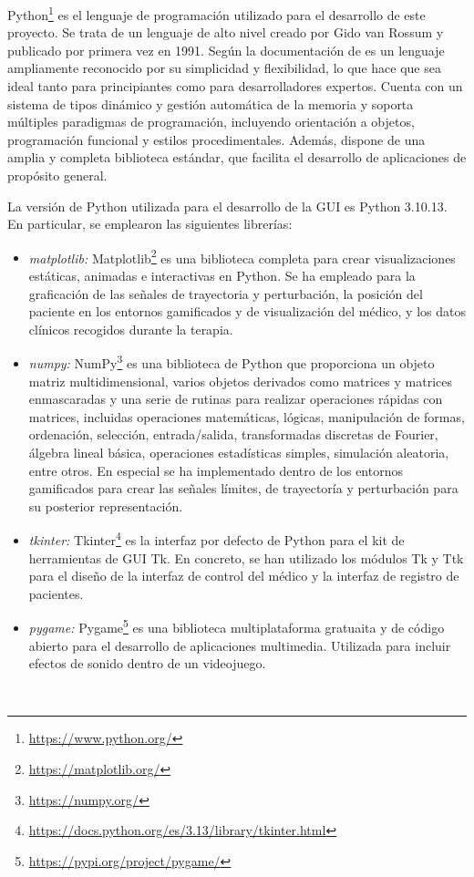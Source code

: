 Python\footnote{\url{https://www.python.org/}} es el lenguaje de programación utilizado para el desarrollo de este proyecto.
Se trata de un lenguaje de alto nivel creado por Gido van Rossum y publicado por primera vez en 1991.
Según la documentación de \cite{perales9b} es un lenguaje ampliamente reconocido por su simplicidad y flexibilidad, lo que hace que sea ideal tanto para principiantes como para desarrolladores expertos. Cuenta con un sistema de tipos dinámico y gestión automática de la memoria y soporta múltiples paradigmas de programación, incluyendo orientación a objetos, programación funcional y estilos procedimentales. Además, dispone de una amplia y completa biblioteca estándar, que facilita el desarrollo de aplicaciones de propósito general.

La versión de Python utilizada para el desarrollo de la GUI es Python 3.10.13. En particular, se emplearon las siguientes librerías:

\begin{itemize}
    \item \textit{matplotlib:} Matplotlib\footnote{\url{https://matplotlib.org/}} es una biblioteca completa para crear visualizaciones estáticas, animadas e interactivas en Python. Se ha empleado para la graficación de las señales de trayectoria y perturbación, la posición del paciente en los entornos gamificados y de visualización del médico, y los datos clínicos recogidos durante la terapia.
    \item \textit{numpy:} NumPy\footnote{\url{https://numpy.org/}} es una biblioteca de Python que proporciona un objeto matriz multidimensional, varios objetos derivados como matrices y matrices enmascaradas y una serie de rutinas para realizar operaciones rápidas con matrices, incluidas operaciones matemáticas, lógicas, manipulación de formas, ordenación, selección, entrada/salida, transformadas discretas de Fourier, álgebra lineal básica, operaciones estadísticas simples, simulación aleatoria, entre otros. En especial se ha implementado dentro de los entornos gamificados para crear las señales límites, de trayectoría y perturbación para su posterior representación.
    \item \textit{tkinter:} Tkinter\footnote{\url{https://docs.python.org/es/3.13/library/tkinter.html}} es la interfaz por defecto de Python para el kit de herramientas de GUI Tk. En concreto, se han utilizado los módulos Tk y Ttk para el diseño de la interfaz de control del médico y la interfaz de registro de pacientes.
	\item \textit{pygame:} Pygame\footnote{\url{https://pypi.org/project/pygame/}} es una biblioteca multiplataforma gratuaita y de código abierto para el desarrollo de aplicaciones multimedia. Utilizada para incluir efectos de sonido dentro de un videojuego.
\end{itemize}\

